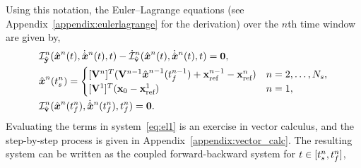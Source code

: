 Using this notation, the Euler--Lagrange equations (see
Appendix~\ref{appendix:eulerlagrange} for the derivation) over the $n$th
time window are given by, 
\begin{equation}\label{eq:el1} 
\begin{split}
& \dIdYArg{n}(\genstateArg{n}{t},\genstateDotArg{n}{t},t) - \dIdVDotArg{n}(\genstateArg{n}{t},\genstateDotArg{n}{t}, t )  = \bz, \\ 
&\genstate^n(\timeStartArg{n})  = \begin{cases} 
\spatialIC &
n=2,\ldots,\nslabs, \\ 
\genstateICOne & n=1,
\end{cases}\\ 
&\dIdVArg{n}(\genstateArg{n}{\timeEndArg{n}},\genstateDotArg{n}{\timeEndArg{n}},\timeEndArg{n})  = \bz.
\end{split} 
\end{equation}
Evaluating the terms in system~\eqref{eq:el1} is an exercise in
vector calculus, and the step-by-step process is given in
Appendix~\ref{appendix:vector_calc}. The resulting system can be written as the 
coupled forward-backward system for $t \in [t_s^{n},t_f^{n} ]$,
